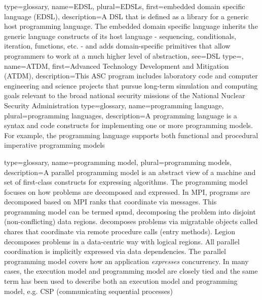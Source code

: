 {
  type=glossary,
  name={EDSL},
  plural={EDSLs},
  first={embedded domain specific language (EDSL)},
  description={A \gls{DSL} that is defined as a library for a
    generic host programming language. The embedded domain specific language
      inherits the generic language constructs of its host language -
      sequencing, conditionals, iteration, functions, etc. - and adds
      domain-specific primitives that allow programmers to work at a much
      higher level of abstraction},
  see={DSL}
}
{
  type=\acronymtype,
  name={ATDM},
  first={Advanced Technology Development and Mitigation (ATDM)},
  description={This \gls{ASC} program includes laboratory code and computer engineering and science projects that pursue long-term simulation and computing goals relevant to the broad national security missions of the National Nuclear Security Administration}
}
{
  type=glossary,
  name={programming language},
  plural={programming languages},
  description={A programming language is a syntax and code constructs for
    implementing one or more \glspl{programming model}.
  For example, the \CC{} programming language supports both \gls{functional} and
    \gls{procedural} \gls{imperative} \glspl{programming model}}
}

{
  type=glossary,
  name={programming model},
  plural={programming models},
  description={A parallel programming model is an abstract view of a machine
    and set of first-class constructs for expressing algorithms. The programming
      model focuses on how problems are decomposed and expressed.  In
      \gls{MPI}, programs are decomposed based on \gls{MPI} ranks that coordinate via
      messages. This programming model can be termed \gls{spmd}, decomposing
      the problem into disjoint (non-conflicting) data regions.  \Charm{}
    decomposes problems via migratable objects called \glspl{chare} that
      coordinate via remote procedure calls (entry methods). Legion decomposes
      problems in a data-centric way with logical regions.  All parallel
      coordination is implicitly expressed via data dependencies.  The parallel
      programming model covers how an application \emph{expresses}
    \gls{concurrency}.
In many cases, the \gls{execution model} and programming model are closely tied
and the same term has been used to describe both an execution model and programming model, e.g.
CSP (communicating sequential processes)}
}

